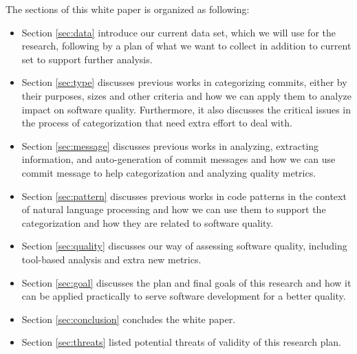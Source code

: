 The sections of this white paper is organized as following:
\begin{itemize}
    \item Section \ref{sec:data} introduce our current data set, which we will use for the research, following by a plan of what we want to collect in addition to current set to support further analysis.
    \item Section \ref{sec:type} discusses previous works in categorizing commits, either by their purposes, sizes and other criteria and how we can apply them to analyze impact on software quality. Furthermore, it also discusses the critical issues in the process of categorization that need extra effort to deal with.
    \item Section \ref{sec:message} discusses previous works in analyzing, extracting information, and auto-generation of commit messages and how we can use commit message to help categorization and analyzing quality metrics.
    \item Section \ref{sec:pattern} discusses previous works in code patterns in the context of natural language processing and how we can use them to support the categorization and how they are related to software quality.
    \item Section \ref{sec:quality} discusses our way of assessing software quality, including tool-based analysis and extra new metrics.
    \item Section \ref{sec:goal} discusses the plan and final goals of this research and how it can be applied practically to serve software development for a better quality.
    \item Section \ref{sec:conclusion} concludes the white paper.
    \item Section \ref{sec:threats} listed potential threats of validity of this research plan.
\end{itemize}


